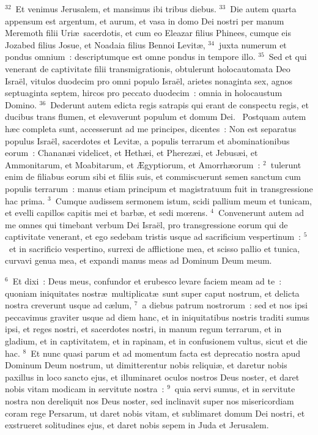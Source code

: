 ${}^{32}$~Et venimus Jerusalem, et mansimus ibi tribus diebus.
${}^{33}$~Die autem quarta appensum est argentum, et aurum, et vasa in domo Dei nostri per manum Meremoth filii Uri\ae\ sacerdotis, et cum eo Eleazar filius Phinees, cumque eis Jozabed filius Josue, et Noadaia filius Bennoi Levit\ae ,
${}^{34}$~juxta numerum et pondus omnium~: descriptumque est omne pondus in tempore illo.
${}^{35}$~Sed et qui venerant de captivitate filii transmigrationis, obtulerunt holocautomata Deo Isra\"el, vitulos duodecim pro omni populo Isra\"el, arietes nonaginta sex, agnos septuaginta septem, hircos pro peccato duodecim~: omnia in holocaustum Domino.
${}^{36}$~Dederunt autem edicta regis satrapis qui erant de conspectu regis, et ducibus trans flumen, et elevaverunt populum et domum Dei.
~Postquam autem h\ae c completa sunt, accesserunt ad me principes, dicentes~: Non est separatus populus Isra\"el, sacerdotes et Levit\ae , a populis terrarum et abominationibus eorum~: Chanan\ae i videlicet, et Heth\ae i, et Pherez\ae i, et Jebus\ae i, et Ammonitarum, et Moabitarum, et \AE gyptiorum, et Amorrh\ae orum~:
${}^{2}$~tulerunt enim de filiabus eorum sibi et filiis suis, et commiscuerunt semen sanctum cum populis terrarum~: manus etiam principum et magistratuum fuit in transgressione hac prima.
${}^{3}$~Cumque audissem sermonem istum, scidi pallium meum et tunicam, et evelli capillos capitis mei et barb\ae , et sedi mœrens.
${}^{4}$~Convenerunt autem ad me omnes qui timebant verbum Dei Isra\"el, pro transgressione eorum qui de captivitate venerant, et ego sedebam tristis usque ad sacrificium vespertinum~:
${}^{5}$~et in sacrificio vespertino, surrexi de afflictione mea, et scisso pallio et tunica, curvavi genua mea, et expandi manus meas ad Dominum Deum meum.


${}^{6}$~Et dixi~: Deus meus, confundor et erubesco levare faciem meam ad te~: quoniam iniquitates nostr\ae\ multiplicat\ae\ sunt super caput nostrum, et delicta nostra creverunt usque ad c\ae lum,
${}^{7}$~a diebus patrum nostrorum~: sed et nos ipsi peccavimus graviter usque ad diem hanc, et in iniquitatibus nostris traditi sumus ipsi, et reges nostri, et sacerdotes nostri, in manum regum terrarum, et in gladium, et in captivitatem, et in rapinam, et in confusionem vultus, sicut et die hac.
${}^{8}$~Et nunc quasi parum et ad momentum facta est deprecatio nostra apud Dominum Deum nostrum, ut dimitterentur nobis reliqui\ae , et daretur nobis paxillus in loco sancto ejus, et illuminaret oculos nostros Deus noster, et daret nobis vitam modicam in servitute nostra~:
${}^{9}$~quia servi sumus, et in servitute nostra non dereliquit nos Deus noster, sed inclinavit super nos misericordiam coram rege Persarum, ut daret nobis vitam, et sublimaret domum Dei nostri, et exstrueret solitudines ejus, et daret nobis sepem in Juda et Jerusalem.


